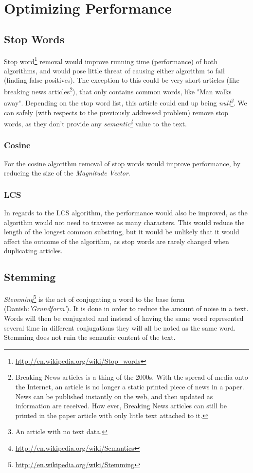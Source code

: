 \section{Optimizing Performance}
\subsection{Stop Words}
Stop word\footnote{\url{http://en.wikipedia.org/wiki/Stop_words}} removal would improve running time (performance) of both algorithms, and would pose little threat of causing either algorithm to fail (finding false positives). The exception to this could be very short articles (like breaking news articles\footnote{Breaking News articles is a thing of the 2000s. With the spread of media onto the Internet, an article is no longer a static printed piece of news in a paper. News can be published instantly on the web, and then updated as information are received. How ever, Breaking News articles can still be printed in the paper article with only little text attached to it.}), that only contains common words, like "Man walks away". Depending on the stop word list, this article could end up being \textit{null\footnote{An article with no text data.}}.
We can safely (with respects to the previously addressed problem) remove stop words, as they don't provide any \textit{semantic\footnote{\url{http://en.wikipedia.org/wiki/Semantics}}} value to the text.

\subsubsection{Cosine}
For the cosine algorithm removal of stop words would improve performance, by reducing the size of the \textit{Magnitude Vector}. 

\subsubsection{LCS}
In regards to the LCS algorithm, the performance would also be improved, as the algorithm would not need to traverse as many characters. This would reduce the length of the longest common substring, but it would be unlikely that it would affect the outcome of the algorithm, as stop words are rarely changed when duplicating articles.

\subsection{Stemming}
\textit{Stemming}\footnote{\url{http://en.wikipedia.org/wiki/Stemming}} is the act of conjugating a word to the base form (Danish:\textit{'Grundform'}). It is done in order to reduce the amount of noise in a text. Words will then be conjugated and instead of having the same word represented several time in different conjugations they will all be noted as the same word. Stemming does not ruin the semantic content of the text.

